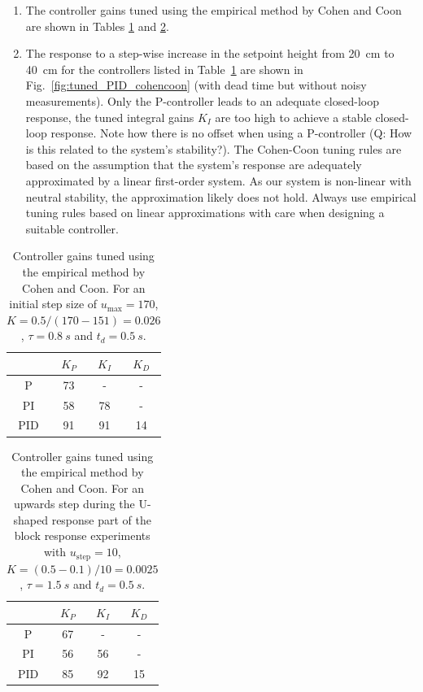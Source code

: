\documentclass[10pt,twoside,openright]{article}
\begin{document}
\begin{enumerate}
\setlength\itemsep{0em}
\item The controller gains tuned using the empirical method by Cohen and Coon are shown in Tables \ref{tab:cohen_coon_tuned1} and \ref{tab:cohen_coon_tuned2}.
\item The response to a step-wise increase in the setpoint height from 20~cm to 40~cm for the controllers listed in Table~\ref{tab:cohen_coon_tuned1} are shown in Fig.~\ref{fig:tuned_PID_cohencoon} (with dead time but without noisy measurements). Only the P-controller leads to an adequate closed-loop response, the tuned integral gains $K_I$ are too high to achieve a stable closed-loop response. Note how there is no offset when using a P-controller (Q: How is this related to the system's stability?). The Cohen-Coon tuning rules are based on the assumption that the system's response are adequately approximated by a linear first-order system. As our system is non-linear with neutral stability, the approximation likely does not hold. Always use empirical tuning rules based on linear approximations with care when designing a suitable controller.
\end{enumerate}

\begin{table}[h!]
\caption{Controller gains tuned using the empirical method by Cohen and Coon. For an initial step size of $u_{\text{max}} = 170$, $K = 0.5 / (170 - 151) = 0.026$, $\tau = 0.8~s$ and $t_d = 0.5~s$.}
\centering
 \begin{tabular}{|c | c c c|} 
 \hline
  & $K_P$ & $K_I$ & $K_D$ \\ [0.5ex] 
 \hline
 P & 73 & - & - \\ [3mm] 
 PI & 58 & 78 & - \\ [3mm] 
 PID & 91 & 91 & 14 \\ [3mm] 
 \hline
 \end{tabular}
 \label{tab:cohen_coon_tuned1}
\end{table}

\begin{table}[h!]
\caption{Controller gains tuned using the empirical method by Cohen and Coon. For an upwards step during the U-shaped response part of the block response experiments with $u_{\text{step}} = 10$, $K = (0.5 - 0.1) / 10 = 0.0025$, $\tau = 1.5~s$ and $t_d = 0.5~s$.}
\centering
 \begin{tabular}{|c | c c c|} 
 \hline
  & $K_P$ & $K_I$ & $K_D$ \\ [0.5ex] 
 \hline
 P & 67 & - & - \\ [3mm] 
 PI & 56 & 56 & - \\ [3mm] 
 PID & 85 & 92 & 15 \\ [3mm] 
 \hline
 \end{tabular}
 \label{tab:cohen_coon_tuned2}
\end{table}
\end{document}
